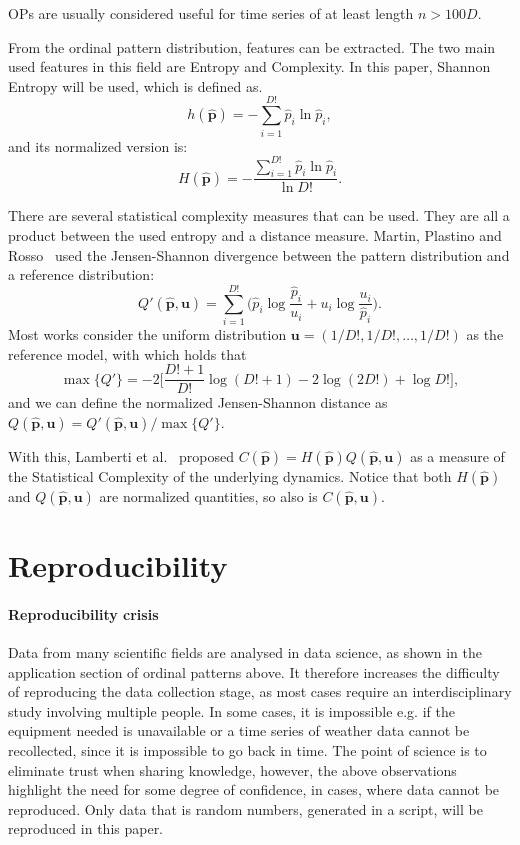 OPs are usually considered useful for time series of at least length $n>100D$.

From the ordinal pattern distribution, features can be extracted. 
The two main used features in this field are Entropy and Complexity. 
In this paper, Shannon Entropy will be used, which is defined as.
$$
h(\widehat{\bm p})=-\sum_{i=1}^{D!} \widehat{p}_i \ln \widehat{p}_i,
$$
and its normalized version is:
$$
H(\widehat{\bm p})=-\frac{\sum_{i=1}^{D!} \widehat{p}_i  \ln \widehat{p}_i}{\ln D!}.
$$

There are several statistical complexity measures that can be used. 
They are all a product between the used entropy and a distance measure. 
Martin, Plastino and Rosso~\cite{Martin2003} used the Jensen-Shannon divergence between the pattern distribution and a reference distribution:
\begin{equation}
	Q'(\widehat{\bm p}, \bm{u}) = \sum_{i=1}^{D!} \Big(\widehat{p}_i \log\frac{\widehat{p}_i}{u_i} +
	u_i \log\frac{u_i}{\widehat{p}_i}
	\Big).
	\label{eq:JensenShannon}
\end{equation}
Most works consider the uniform distribution $\bm u = (1/D!, 1/D!, \dots, 1/D!)$ as the reference model, with which holds that
$$
\max\{Q'\} = -2\Big[
\frac{D!+1}{D!} \log(D!+1) - 2 \log(2D!) + \log D!
\Big],
$$
and we can define the normalized Jensen-Shannon distance as $Q(\widehat{\bm p}, \bm{u})=Q'(\widehat{\bm p}, \bm{u})/\max\{Q'\}$.

With this, Lamberti et al.~\cite{Lamberti2004} proposed $C(\widehat{\bm p})=H(\widehat{\bm p})Q(\widehat{\bm p}, \bm{u})$ as a measure of the Statistical Complexity of the underlying dynamics.
Notice that both $H(\widehat{\bm p})$ and $Q(\widehat{\bm p}, \bm{u})$ are normalized quantities, so also is $C(\widehat{\bm p}, \bm{u})$. 


\section{Reproducibility}
\paragraph{Reproducibility crisis}
Data from many scientific fields are analysed in data science, as shown in the application section of ordinal patterns above. It therefore increases the difficulty of reproducing the data collection stage, as most cases require an interdisciplinary study involving multiple people. In some cases, it is impossible e.g. if the equipment needed is unavailable or a time series of weather data cannot be recollected, since it is impossible to go back in time. The point of science is to eliminate trust when sharing knowledge, however, the above observations highlight the need for some degree of confidence, in cases, where data cannot be reproduced. Only data that is random numbers, generated in a script, will be reproduced in this paper.

